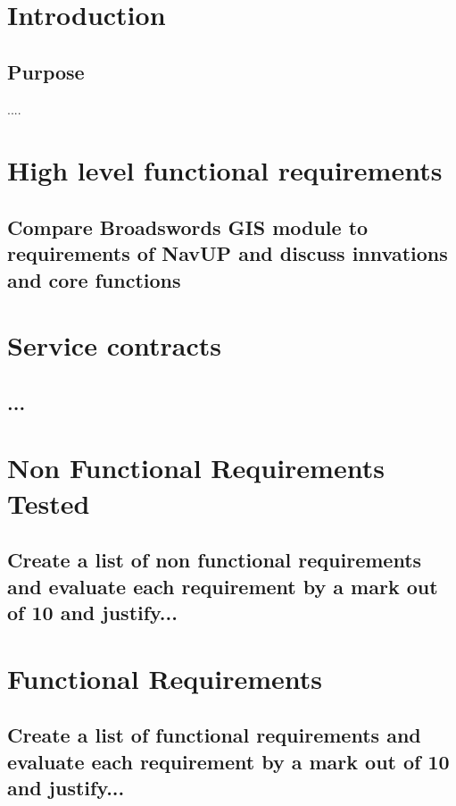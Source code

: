 \documentclass[runningheads,a4paper]{article}
\begin{document}
\begingroup

\tableofcontents
{}
\endgroup
\newpage


\section{Introduction}

\subsection{Purpose}
....
\section{High level functional requirements}
\subsection{Compare Broadswords GIS module to requirements of NavUP and discuss innvations and core functions} 
\section{Service contracts}
\subsection{...}
\section{Non Functional Requirements Tested}
\subsection{Create a list of non functional requirements and evaluate each requirement by a mark out of 10 and justify...}

\section{Functional Requirements}
\subsection{Create a list of functional requirements and evaluate each requirement by a mark out of 10 and justify...}
\end{document}
